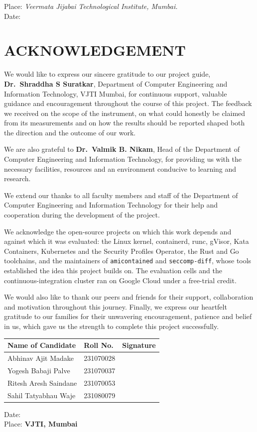 \documentclass[12pt,a4paper,openany,oneside]{report}
\newcommand{\guidename}{Dr.~Shraddha S Suratkar}
\newcommand{\hodname}{Dr.~Valmik B. Nikam}
\newcommand{\reportdate}{}
\renewcommand{\arraystretch}{1.12}
\newcommand{\candidatetable}{%
\begin{center}
\renewcommand{\arraystretch}{1.3}
\begin{tabular}{|p{6.2cm}|p{3.2cm}|p{4.2cm}|}
\hline
\textbf{Name of Candidate} & \textbf{Roll No.} & \textbf{Signature}\\ \hline
Abhinav Ajit Madake & 231070028 & \\ \hline
Yogesh Babaji Palve & 231070037 & \\ \hline
Ritesh Aresh Saindane & 231070053 & \\ \hline
Sahil Tatyabhau Waje & 231080079 & \\ \hline
\end{tabular}
\end{center}}
\begin{document}
\vspace{2.4cm}
\noindent Place: \textit{Veermata Jijabai Technological Institute, Mumbai.}\\
Date: \reportdate

\clearpage
\section*{\centering ACKNOWLEDGEMENT}

We would like to express our sincere gratitude to our project guide, \textbf{\guidename}, Department of Computer Engineering and Information Technology, VJTI Mumbai, for continuous support, valuable guidance and encouragement throughout the course of this project. The feedback we received on the scope of the instrument, on what could honestly be claimed from its measurements and on how the results should be reported shaped both the direction and the outcome of our work.

We are also grateful to \textbf{\hodname}, Head of the Department of Computer Engineering and Information Technology, for providing us with the necessary facilities, resources and an environment conducive to learning and research.

We extend our thanks to all faculty members and staff of the Department of Computer Engineering and Information Technology for their help and cooperation during the development of the project.

We acknowledge the open-source projects on which this work depends and against which it was evaluated: the Linux kernel, containerd, runc, gVisor, Kata Containers, Kubernetes and the Security Profiles Operator, the Rust and Go toolchains, and the maintainers of \texttt{amicontained} and \texttt{seccomp-diff}, whose tools established the idea this project builds on. The evaluation cells and the continuous-integration cluster ran on Google Cloud under a free-trial credit.

We would also like to thank our peers and friends for their support, collaboration and motivation throughout this journey. Finally, we express our heartfelt gratitude to our families for their unwavering encouragement, patience and belief in us, which gave us the strength to complete this project successfully.

\vspace{1.0cm}
\candidatetable
\vspace{0.6cm}
\noindent Date: \textbf{\reportdate}\\
Place: \textbf{VJTI, Mumbai}
\end{document}
